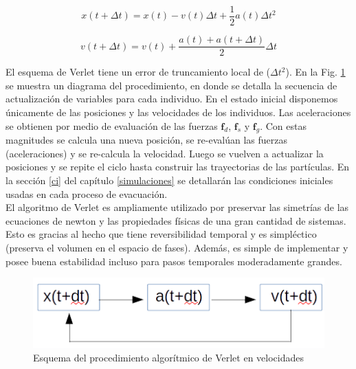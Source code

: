 \begin{equation}
x(t+\Delta t)=x(t)-v(t)\Delta t + \frac{1}{2}a(t)\Delta t^2 
\label{verlet_x}
\end{equation} 

\begin{equation}
v(t+\Delta t)=v(t)+\frac{a(t)+a(t+\Delta t)}{2}\Delta t
\label{verlet_v}
\end{equation}

El esquema de Verlet tiene un error de truncamiento local de ($\Delta t^2$). En la Fig. \ref{esquema_verlet} se muestra un diagrama del procedimiento, en donde se detalla la secuencia de actualización de variables para cada individuo. En el estado inicial disponemos únicamente de las posiciones y las velocidades de los individuos. Las aceleraciones se obtienen por medio de evaluación de las fuerzas $\mathbf{f}_d$, $\mathbf{f}_s$ y $\mathbf{f}_g$. Con estas magnitudes 
se calcula una nueva posición, se re-evalúan las fuerzas (aceleraciones) y se re-calcula la velocidad. Luego se vuelven a actualizar la posiciones y se repite el ciclo hasta construir las trayectorias de las partículas.
En la sección \ref{ci} del capítulo \ref{simulaciones} se detallarán las condiciones iniciales usadas en cada proceso de evacuación.\\

El algoritmo de Verlet es ampliamente utilizado por preservar las simetrías de las ecuaciones de newton y las propiedades físicas de una gran cantidad de sistemas. Esto es gracias al hecho que tiene reversibilidad temporal y es simpléctico (preserva el volumen en el espacio de fases). Además, es simple de implementar y posee buena estabilidad incluso para pasos temporales moderadamente grandes.

\begin{figure}[H]
    \centering
        \includegraphics[scale=0.7]{figuras/esquema_verlet.png}
    \caption[width=5cm]{Esquema del procedimiento algorítmico de Verlet en velocidades}
    \label{esquema_verlet}
\end{figure}
